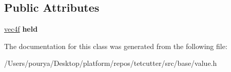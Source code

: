 \subsection*{Public Attributes}
\begin{DoxyCompactItemize}
\item 
\hypertarget{classps_1_1PRIVATE_1_1holder_3_01vec4f_01_4_ab7c277fc6ca38db0a67f2d786aad6a3e}{}\hyperlink{classps_1_1base_1_1Vec4}{vec4f} {\bfseries held}\label{classps_1_1PRIVATE_1_1holder_3_01vec4f_01_4_ab7c277fc6ca38db0a67f2d786aad6a3e}

\end{DoxyCompactItemize}


The documentation for this class was generated from the following file\+:\begin{DoxyCompactItemize}
\item 
/\+Users/pourya/\+Desktop/platform/repos/tetcutter/src/base/value.\+h\end{DoxyCompactItemize}
